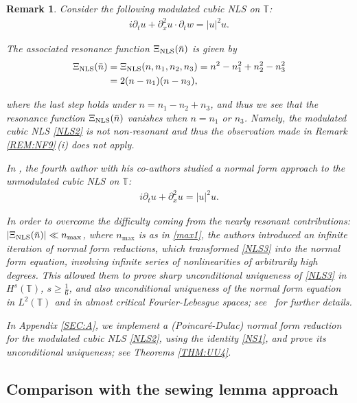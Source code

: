 \documentclass[letterpaper, 11pt,  reqno]{amsart}
\newtheorem{remark}[theorem]{Remark}
\newcommand{\1}{\hspace{0.5mm}\text{I}\hspace{0.5mm}}
\newcommand{\noi}{\noindent}
\newcommand{\T}{\mathbb{T}}
\newcommand{\dx}{\partial_x}
\newcommand{\dt}{\partial_t}
\newcommand{\NLS}{\text{\rm NLS} }
\numberwithin{equation}{section}
\numberwithin{theorem}{section}
\begin{document}
\begin{remark}\rm
Consider the following modulated cubic NLS on $\T$:
\begin{align}
i \dt u + \dx^2 u \cdot \dt w= |u|^2u.
\label{NLS2}
\end{align}

\noi
The associated resonance function 
$\Xi_\NLS (\bar n)$  is given by 
\begin{align}
\begin{split}
\Xi_\NLS (\bar n)
& = \Xi_\NLS(n,n_1,n_2, n_3) = 
n^2 - n_1^2 + n_2^2 - n_3^2\\
& = 2(n- n_1) (n - n_3), 
\end{split}
\label{Xi9}
\end{align}


\noi
where the last step holds under $n = n_1 - n_2 + n_3$, 
and thus we see that 
 the resonance function 
$\Xi_\NLS (\bar n)$
 vanishes when $n = n_1$ or $n_3$.
Namely, the modulated cubic NLS \eqref{NLS2} is 
not non-resonant and thus the observation made in 
Remark \ref{REM:NF9}\,(i) 
does not apply.




In \cite{GKO, OW}, 
the fourth author with his co-authors 
studied a normal form approach to 
 the unmodulated cubic NLS  on $\T$:
\begin{align}
i \dt u + \dx^2 u = |u|^2u.
\label{NLS3}
\end{align}

\noi
In order to overcome
the difficulty coming from  the nearly resonant contributions: $|\Xi_\NLS(\bar n)| \ll n_{\max}$, 
where $n_{\max}$ is as in \eqref{max1},
the authors introduced 
 an 
 infinite iteration of normal form reductions, 
which  transformed \eqref{NLS3}
 into the normal form equation, 
involving infinite series of nonlinearities of arbitrarily high degrees.
This allowed them to prove 
sharp unconditional uniqueness 
of  \eqref{NLS3} in $H^s(\T)$, $s \ge \frac 16$, 
and also unconditional uniqueness
of the normal form equation in $L^2(\T)$
and 
in almost critical Fourier-Lebesgue spaces;
see~\cite{OW}
for further details.



In Appendix \ref{SEC:A}, 
we implement a (Poincar\'e-Dulac) normal form reduction for the modulated cubic NLS \eqref{NLS2}, 
using the identity 
\eqref{NS1},
and prove its unconditional uniqueness;
 see Theorems \ref{THM:UU4}. %
\end{remark}


\subsection{Comparison with 
the sewing lemma approach}
\label{SUBSEC:comp}
\end{document}
